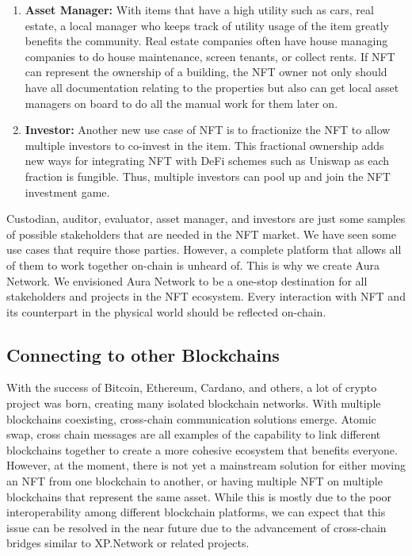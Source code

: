 \documentclass[12pt]{article}
\begin{document}
\begin{enumerate}
    \item \textbf{Asset Manager:} With items that have a high utility such as cars, real estate, a local manager who keeps track of utility usage of the item greatly benefits the community. Real estate companies often have house managing companies to do house maintenance, screen tenants, or collect rents. If NFT can represent the ownership of a building, the NFT owner not only should have all documentation relating to the properties but also can get local asset managers on board to do all the manual work for them later on. 
    
    \item \textbf{Investor:} Another new use case of NFT is to fractionize the NFT to allow multiple investors to co-invest in the item. This fractional ownership adds new ways for integrating NFT with DeFi schemes such as Uniswap as each fraction is fungible. Thus, multiple investors can pool up and join the NFT investment game.
\end{enumerate}

Custodian, auditor, evaluator, asset manager, and investors are just some samples of possible stakeholders that are needed in the NFT market. We have seen some use cases that require those parties. However, a complete platform that allows all of them to work together on-chain is unheard of. This is why we create Aura Network. We envisioned Aura Network to be a one-stop destination for all stakeholders and projects in the NFT ecosystem. Every interaction with NFT and its counterpart in the physical world should be reflected on-chain.

\subsection{Connecting to other Blockchains}

With the success of Bitcoin, Ethereum, Cardano, and others, a lot of crypto project was born, creating many isolated blockchain networks. With multiple blockchains coexisting, cross-chain communication solutions emerge. Atomic swap, cross chain messages are all examples of the capability to link different blockchains together to create a more cohesive ecosystem that benefits everyone. However, at the moment, there is not yet a mainstream solution for either moving an NFT from one blockchain to another, or having multiple NFT on multiple blockchains that represent the same asset. While this is mostly due to the poor interoperability among different blockchain platforms, we can expect that this issue can be resolved in the near future due to the advancement of cross-chain bridges similar to XP.Network \cite{xpnetwork} or related projects. 
\end{document}
